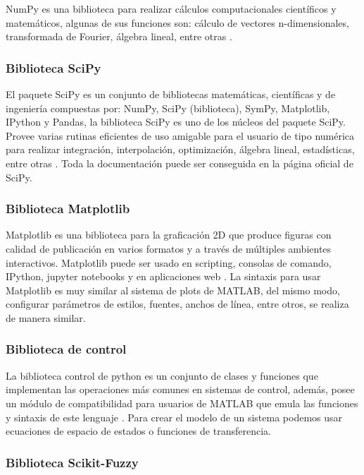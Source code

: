             NumPy es una biblioteca para realizar cálculos computacionales científicos y matemáticos, algunas de sus funciones son: cálculo de vectores n-dimensionales, transformada de Fourier, álgebra lineal, entre otras \Parencite{numpy}.

        \subsubsection{Biblioteca SciPy}	

            El paquete SciPy es un conjunto de bibliotecas matemáticas, científicas y de ingeniería compuestas por: NumPy, SciPy (biblioteca), SymPy, Matplotlib, IPython y Pandas, la biblioteca SciPy es uno de los núcleos del paquete SciPy. Provee varias rutinas eficientes de uso amigable para el usuario de tipo numérica para realizar integración, interpolación, optimización, álgebra lineal, estadísticas, entre otras \Parencite{scipy}. Toda la documentación puede ser conseguida en la página oficial de SciPy.
            
        \subsubsection{Biblioteca Matplotlib}

            Matplotlib es una biblioteca para la graficación 2D que produce figuras con calidad de publicación en varios formatos y a través de múltiples ambientes interactivos. Matplotlib puede ser usado en scripting, consolas de comando, IPython, jupyter notebooks y en aplicaciones web \Parencite{Hunter:2007}. La sintaxis para usar Matplotlib es muy similar al sistema de plots de MATLAB, del mismo modo, configurar parámetros de estilos, fuentes, anchos de línea, entre otros, se realiza de manera similar.

        \subsubsection{Biblioteca de control}

            La biblioteca control de python es un conjunto de clases y funciones que implementan las operaciones más comunes en sistemas de control, además, posee un módulo de compatibilidad para usuarios de MATLAB que emula las funciones y sintaxis de este lenguaje \Parencite{pythoncontrol}. Para crear el modelo de un sistema podemos usar ecuaciones de espacio de estados o funciones de transferencia.

        \subsubsection{Biblioteca Scikit-Fuzzy}
            
